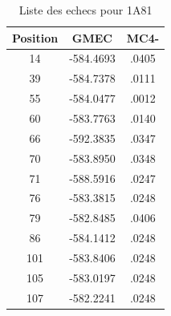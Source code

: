 \documentclass[a4paper,12pt]{article}
\begin{document}
    \begin{table}[!htbp]
      \centering

      \begin{tabular}{|c|c|c|}


        \hline
        Position & GMEC & MC4- \\
        \hline
        14 & -584.4693 & .0405 \\
        39 & -584.7378 & .0111 \\
        55 & -584.0477 & .0012 \\
        60 & -583.7763 & .0140 \\
        66 & -592.3835 & .0347 \\
        70 & -583.8950 & .0348 \\
        71 & -588.5916 & .0247 \\
        76 & -583.3815 & .0248 \\
        79 & -582.8485 & .0406 \\
        86 & -584.1412 & .0248 \\
        101 & -583.8406 & .0248 \\
        105 & -583.0197 & .0248 \\
        107 & -582.2241 & .0248 \\

        \hline


      \end{tabular}      
      \caption{Liste des echecs pour 1A81}
      \label{tab_best_ener_no_active}      
    \end{table}
\end{document}
